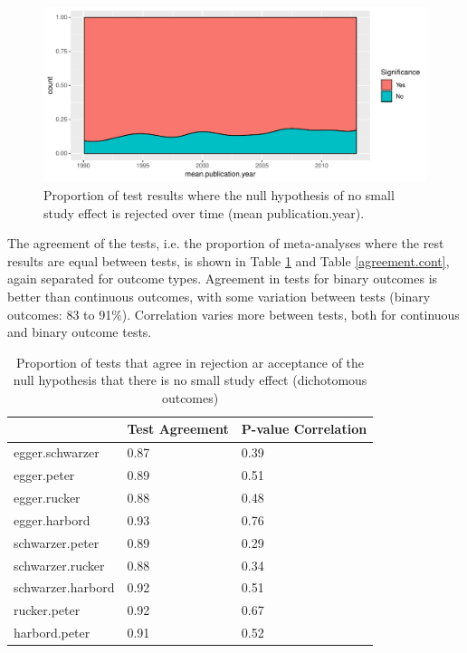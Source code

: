 \documentclass[11pt,a4paper,twoside]{book}\usepackage[]{graphicx}\usepackage[]{color}
\newenvironment{knitrout}{}{} %
\begin{document}
\begin{figure}
\begin{knitrout}
\color{fgcolor}

{\centering \includegraphics[width=\textwidth-3cm]{figure/ch02_figunnamed-chunk-30-1} 

}



\end{knitrout}
\caption{Proportion of test results where the null hypothesis of no small study effect is rejected over time (mean publication.year).}
\label{pub.bias.overtime}
\end{figure}


The agreement of the tests, i.e. the proportion of meta-analyses where the rest results are equal between tests, is shown in Table \ref{agreement.bin} and Table \ref{agreement.cont}, again separated for outcome types. Agreement in tests for binary outcomes is better than continuous outcomes, with some variation between tests (binary outcomes: 83 to 91\%). Correlation varies more between tests, both for continuous and binary outcome tests.

\begin{table}[ht]
\centering
\begingroup\footnotesize
\begin{tabular}{lll}
  \hline
 & Test Agreement & P-value Correlation \\ 
  \hline
egger.schwarzer & 0.87 & 0.39 \\ 
  egger.peter & 0.89 & 0.51 \\ 
  egger.rucker & 0.88 & 0.48 \\ 
  egger.harbord & 0.93 & 0.76 \\ 
  schwarzer.peter & 0.89 & 0.29 \\ 
  schwarzer.rucker & 0.88 & 0.34 \\ 
  schwarzer.harbord & 0.92 & 0.51 \\ 
  rucker.peter & 0.92 & 0.67 \\ 
  harbord.peter & 0.91 & 0.52 \\ 
   \hline
\end{tabular}
\endgroup
\caption{Proportion of tests that agree in rejection ar acceptance of the null hypothesis that there is no small study effect (dichotomous outcomes)} 
\label{agreement.bin}
\end{table}
\end{document}
